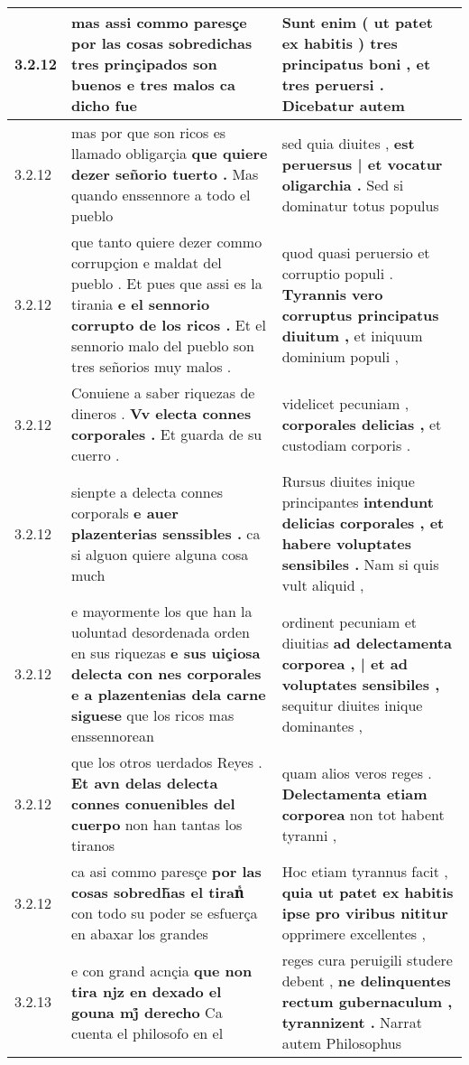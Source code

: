 \begin{tabular}{|p{1cm}|p{6.5cm}|p{6.5cm}|}
3.2.12 & mas assi commo paresçe \textbf{ por las cosas sobredichas tres prinçipados son buenos e tres malos } ca dicho fue & Sunt enim ( ut patet ex habitis ) \textbf{ tres principatus boni , et tres peruersi . } Dicebatur autem \\\hline
3.2.12 & mas por que son ricos es llamado obligarçia \textbf{ que quiere dezer señorio tuerto . } Mas quando enssennore a todo el pueblo & sed quia diuites , \textbf{ est peruersus | et vocatur oligarchia . } Sed si dominatur totus populus \\\hline
3.2.12 & que tanto quiere dezer commo corrupçion e maldat del pueblo . Et pues que assi es la tirania \textbf{ e el sennorio corrupto de los ricos . } Et el sennorio malo del pueblo son tres señorios muy malos . & quod quasi peruersio et corruptio populi . \textbf{ Tyrannis vero corruptus principatus diuitum , } et iniquum dominium populi , \\\hline
3.2.12 & Conuiene a saber riquezas de dineros . \textbf{ Vv electa connes corporales . } Et guarda de su cuerro . & videlicet pecuniam , \textbf{ corporales delicias , } et custodiam corporis . \\\hline
3.2.12 & sienpte a delecta connes corporals \textbf{ e auer plazenterias senssibles . } ca si alguon quiere alguna cosa much & Rursus diuites inique principantes \textbf{ intendunt delicias corporales , et habere voluptates sensibiles . } Nam si quis vult aliquid , \\\hline
3.2.12 & e mayormente los que han la uoluntad desordenada orden en sus riquezas \textbf{ e sus uiçiosa delecta con nes corporales e a plazentenias dela carne siguese } que los ricos mas enssennorean & ordinent pecuniam et diuitias \textbf{ ad delectamenta corporea , | et ad voluptates sensibiles , } sequitur diuites inique dominantes , \\\hline
3.2.12 & que los otros uerdados Reyes . \textbf{ Et avn delas delecta connes conuenibles del cuerpo } non han tantas los tiranos & quam alios veros reges . \textbf{ Delectamenta etiam corporea } non tot habent tyranni , \\\hline
3.2.12 & ca asi commo paresçe \textbf{ por las cosas sobredh̃as el tiranᷤ } con todo su poder se esfuerça en abaxar los grandes & Hoc etiam tyrannus facit , \textbf{ quia ut patet ex habitis ipse pro viribus nititur } opprimere excellentes , \\\hline
3.2.13 & e con grand acnçia \textbf{ que non tira njz en dexado el gouna mj̊ derecho } Ca cuenta el philosofo en el & reges cura peruigili studere debent , \textbf{ ne delinquentes rectum gubernaculum , tyrannizent . } Narrat autem Philosophus \\\hline

\end{tabular}
